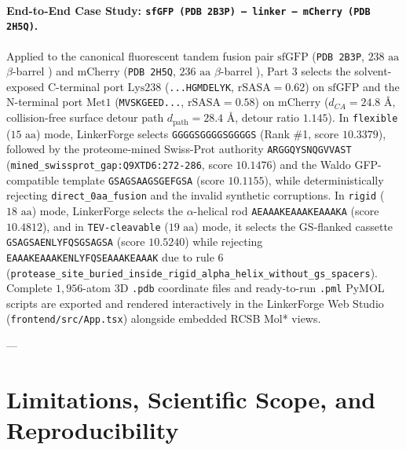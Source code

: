 \documentclass[11pt]{article}
\begin{document}
\paragraph{End-to-End Case Study: \texttt{sfGFP (PDB 2B3P) --- linker --- mCherry (PDB 2H5Q)}.}
Applied to the canonical fluorescent tandem fusion pair $\text{sfGFP}$ (\texttt{PDB 2B3P}, $238\text{ aa}$ $\beta$-barrel \cite{pedelacq2006sfgfp}) and $\text{mCherry}$ (\texttt{PDB 2H5Q}, $236\text{ aa}$ $\beta$-barrel \cite{shu2006mcherry}), Part 3 selects the solvent-exposed C-terminal port $\text{Lys238}$ (\texttt{...HGMDELYK}, $\text{rSASA} = 0.62$) on $\text{sfGFP}$ and the N-terminal port $\text{Met1}$ (\texttt{MVSKGEED...}, $\text{rSASA} = 0.58$) on $\text{mCherry}$ ($d_{CA} = 24.8\text{ \AA}$, collision-free surface detour path $d_{\text{path}} = 28.4\text{ \AA}$, detour ratio $1.145$). In \texttt{flexible} ($15\text{ aa}$) mode, LinkerForge selects \texttt{GGGGSGGGGSGGGGS} (Rank \#1, score $10.3379$), followed by the proteome-mined Swiss-Prot authority \texttt{ARGGQYSNQGVVAST} (\texttt{mined\_swissprot\_gap:Q9XTD6:272-286}, score $10.1476$) and the Waldo GFP-compatible template \texttt{GSAGSAAGSGEFGSA} (score $10.1155$), while deterministically rejecting \texttt{direct\_0aa\_fusion} and the invalid synthetic corruptions. In \texttt{rigid} ($18\text{ aa}$) mode, LinkerForge selects the $\alpha$-helical rod \texttt{AEAAAKEAAAKEAAAKA} (score $10.4812$), and in \texttt{TEV-cleavable} ($19\text{ aa}$) mode, it selects the $\text{GS}$-flanked cassette \texttt{GSAGSAENLYFQSGSAGSA} (score $10.5240$) while rejecting \texttt{EAAAKEAAAKENLYFQSEAAAKEAAAK} due to rule 6 (\texttt{protease\_site\_buried\_inside\_rigid\_alpha\_helix\_without\_gs\_spacers}). Complete $1{,}956$-atom 3D \texttt{.pdb} coordinate files and ready-to-run \texttt{.pml} PyMOL scripts are exported and rendered interactively in the LinkerForge Web Studio (\texttt{frontend/src/App.tsx}) alongside embedded RCSB Mol* views.

---

\section{Limitations, Scientific Scope, and Reproducibility}
\label{sec:limitations}
\end{document}
